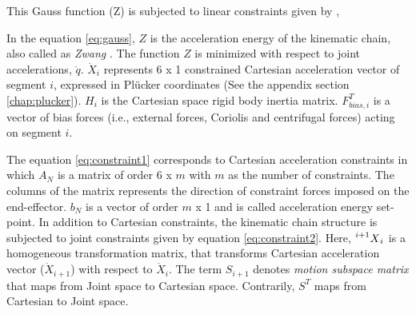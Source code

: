  This Gauss function (Z) is subjected to linear constraints given by \cite{shakhimardanov2015composable},
 
 In the equation \ref{eq:gauss},  $Z$ is the acceleration energy of the kinematic chain, also called as \textit{Zwang} \cite{shakhimardanov2015composable}.  The function $Z$ is minimized with respect to joint accelerations, $\ddot{q}$. $\ddot{X}_i$ represents 6 x 1 constrained Cartesian acceleration vector of segment $i$, expressed in Pl{\"u}cker coordinates (See the appendix section \autoref{chap:plucker}). $H_i$ is the Cartesian space rigid body inertia matrix. $F_{bias, i}^T$ is a vector of bias forces (i.e., external forces, Coriolis and centrifugal forces) acting on segment $i$. 
 
 The equation \ref{eq:constraint1} corresponds to Cartesian acceleration constraints in which $A_N$ is a matrix of order 6 x $m$ with $m$ as the number of constraints. The columns of the matrix represents the direction of constraint forces imposed on the end-effector. $b_N$ is a vector of order $m$ x 1 and is called acceleration energy set-point. In addition to Cartesian constraints, the kinematic chain structure is subjected to joint constraints given by equation \ref{eq:constraint2}. Here, $\prescript{i+1}{}{X}_i$ is a homogeneous transformation matrix, that transforms Cartesian acceleration vector ($\ddot{X}_{i+1}$) with respect to $\ddot{X}_i$. The term $S_{i+1}$ denotes \textit{motion subspace matrix} that maps from Joint space to Cartesian space. Contrarily, $S^T$ maps from Cartesian to Joint space.

% 


